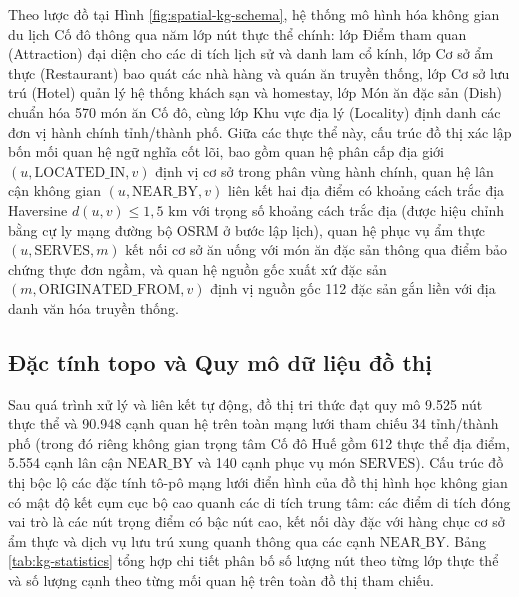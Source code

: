 Theo lược đồ tại Hình \ref{fig:spatial-kg-schema}, hệ thống mô hình hóa không gian du lịch Cố đô thông qua năm lớp nút thực thể chính: lớp Điểm tham quan (Attraction) đại diện cho các di tích lịch sử và danh lam cổ kính, lớp Cơ sở ẩm thực (Restaurant) bao quát các nhà hàng và quán ăn truyền thống, lớp Cơ sở lưu trú (Hotel) quản lý hệ thống khách sạn và homestay, lớp Món ăn đặc sản (Dish) chuẩn hóa 570 món ăn Cố đô, cùng lớp Khu vực địa lý (Locality) định danh các đơn vị hành chính tỉnh/thành phố. Giữa các thực thể này, cấu trúc đồ thị xác lập bốn mối quan hệ ngữ nghĩa cốt lõi, bao gồm quan hệ phân cấp địa giới $(u, \text{LOCATED\_IN}, v)$ định vị cơ sở trong phân vùng hành chính, quan hệ lân cận không gian $(u, \text{NEAR\_BY}, v)$ liên kết hai địa điểm có khoảng cách trắc địa Haversine $d(u, v) \le 1{,}5\text{ km}$ với trọng số khoảng cách trắc địa (được hiệu chỉnh bằng cự ly mạng đường bộ OSRM ở bước lập lịch), quan hệ phục vụ ẩm thực $(u, \text{SERVES}, m)$ kết nối cơ sở ăn uống với món ăn đặc sản thông qua điểm bảo chứng thực đơn ngầm, và quan hệ nguồn gốc xuất xứ đặc sản $(m, \text{ORIGINATED\_FROM}, v)$ định vị nguồn gốc 112 đặc sản gắn liền với địa danh văn hóa truyền thống.

\subsection{Đặc tính topo và Quy mô dữ liệu đồ thị}
\label{subsec:ch1-topo}

Sau quá trình xử lý và liên kết tự động, đồ thị tri thức đạt quy mô 9.525 nút thực thể và 90.948 cạnh quan hệ trên toàn mạng lưới tham chiếu 34 tỉnh/thành phố (trong đó riêng không gian trọng tâm Cố đô Huế gồm 612 thực thể địa điểm, 5.554 cạnh lân cận $\text{NEAR\_BY}$ và 140 cạnh phục vụ món $\text{SERVES}$). Cấu trúc đồ thị bộc lộ các đặc tính tô-pô mạng lưới điển hình của đồ thị hình học không gian có mật độ kết cụm cục bộ cao quanh các di tích trung tâm: các điểm di tích đóng vai trò là các nút trọng điểm có bậc nút cao, kết nối dày đặc với hàng chục cơ sở ẩm thực và dịch vụ lưu trú xung quanh thông qua các cạnh $\text{NEAR\_BY}$. Bảng \ref{tab:kg-statistics} tổng hợp chi tiết phân bố số lượng nút theo từng lớp thực thể và số lượng cạnh theo từng mối quan hệ trên toàn đồ thị tham chiếu.

